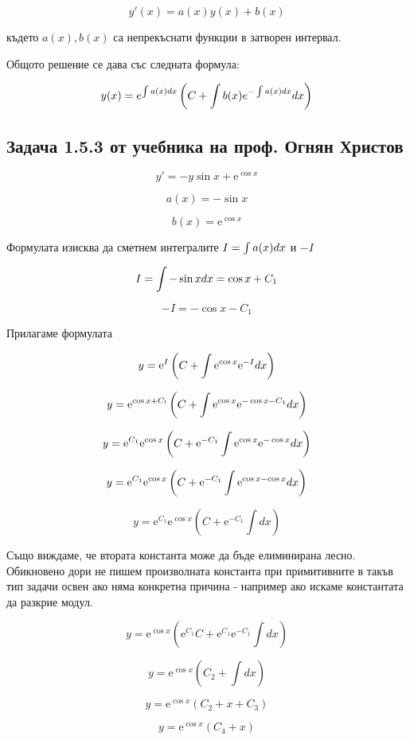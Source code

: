 \documentclass{scrartcl}
\begin{document}
$$y'(x) = a(x)y(x) + b(x)$$

където $a(x), b(x)$ са непрекъснати функции в затворен интервал.

Общото решение се дава със следната формула:

$$y(x) = \displaystyle e^{\int a(x)\space dx}\left( C + \int b(x) e^{-\int a(x) \space dx} \space dx \right)$$

\subsection{Задача 1.5.3 от учебника на проф. Огнян Христов}

$$y' = -y\sin{x} + \mathrm{e}^{\cos{x}}$$

$$a(x) = -\sin{x}$$

$$b(x) = \mathrm{e}^{\cos{x}}$$

Формулата изисква да сметнем интегралите $I = \int a(x) \space dx$ и $-I$

$$I = \int -\sin{x} \space dx = \cos{x} + C_1$$

$$-I = -\cos{x} - C_1$$

Прилагаме формулата

$$y = \mathrm{e}^I\left(C + \int \mathrm{e}^{\cos{x}}\mathrm{e}^{-I}\space dx\right)$$

$$y = \mathrm{e}^{\cos{x}+C_!}\left(C + \int \mathrm{e}^{\cos{x}}\mathrm{e}^{-\cos{x}-C_1}\space dx\right)$$

$$y = \mathrm{e}^{C_1}\mathrm{e}^{\cos{x}}\left(C + \mathrm{e}^{-C_1}\int \mathrm{e}^{\cos{x}}\mathrm{e}^{-\cos{x}}\space dx\right)$$

$$y = \mathrm{e}^{C_1}\mathrm{e}^{\cos{x}}\left(C + \mathrm{e}^{-C_1}\int \mathrm{e}^{\cos{x}-\cos{x}}\space dx\right)$$

$$y = \mathrm{e}^{C_1}\mathrm{e}^{\cos{x}}\left(C + \mathrm{e}^{-C_1}\int dx\right)$$

Също виждаме, че втората константа може да бъде елиминирана лесно. Обикновено дори не пишем произволната константа при примитивните в такъв тип задачи освен ако няма конкретна причина - например ако искаме константата да разкрие модул.

$$y = \mathrm{e}^{\cos{x}}\left(\mathrm{e}^{C_1}C + \mathrm{e}^{C_1}\mathrm{e}^{-C_1}\int dx\right)$$

$$y = \mathrm{e}^{\cos{x}}\left(C_2 + \int dx\right)$$

$$y = \mathrm{e}^{\cos{x}}\left(C_2 + x + C_3 \right)$$

$$y = \mathrm{e}^{\cos{x}}\left(C_4 + x\right)$$
\end{document}
